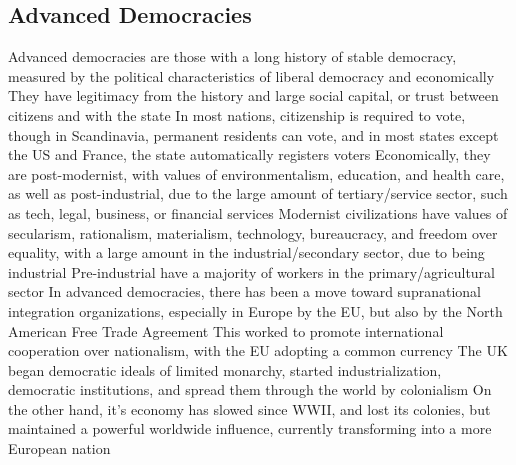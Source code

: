\documentclass[11 pt, twoside]{article}
\newenvironment{outline*}
{
	\begin{outline}[enumerate]
	}
	{\end{outline}
}
\begin{document}
\subsection{Advanced Democracies}
\begin{outline*}
\1 Advanced democracies are those with a long history of stable democracy, measured by the political characteristics of liberal democracy and economically
\2 They have legitimacy from the history and large social capital, or trust between citizens and with the state
\2 In most nations, citizenship is required to vote, though in Scandinavia, permanent residents can vote, and in most states except the US and France, the state automatically registers voters
\1 Economically, they are post-modernist, with values of environmentalism, education, and health care, as well as post-industrial, due to the large amount of tertiary/service sector, such as tech, legal, business, or financial services
\2 Modernist civilizations have values of secularism, rationalism, materialism, technology, bureaucracy, and freedom over equality, with a large amount in the industrial/secondary sector, due to being industrial
\2 Pre-industrial have a majority of workers in the primary/agricultural sector
\1 In advanced democracies, there has been a move toward supranational integration organizations, especially in Europe by the EU, but also by the North American Free Trade Agreement
\2 This worked to promote international cooperation over nationalism, with the EU adopting a common currency
\1 The UK began democratic ideals of limited monarchy, started industrialization, democratic institutions, and spread them through the world by colonialism
\2 On the other hand, it's economy has slowed since WWII, and lost its colonies, but maintained a powerful worldwide influence, currently transforming into a more European nation
\end{outline*}
\end{document}
